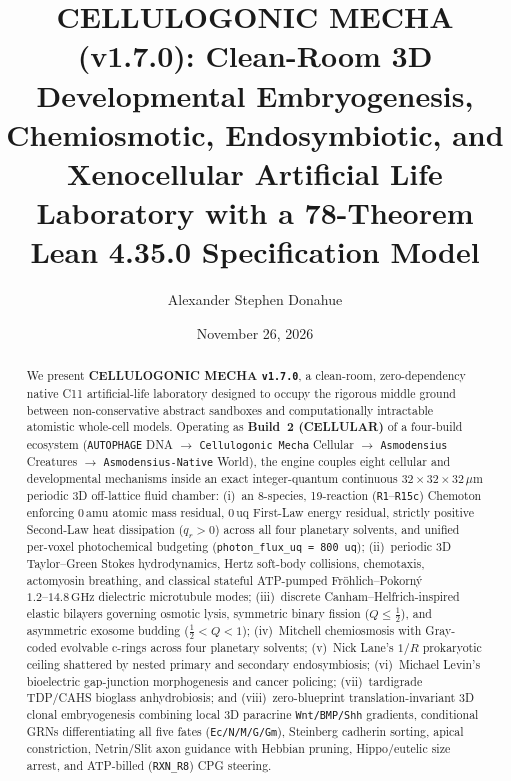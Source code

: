 \documentclass[11pt,reqno]{amsart}
\title[CELLULOGONIC MECHA v1.7.0]{CELLULOGONIC MECHA (v1.7.0): Clean-Room 3D Developmental Embryogenesis, Chemiosmotic, Endosymbiotic, and Xenocellular Artificial Life Laboratory with a 78-Theorem Lean 4.35.0 Specification Model}
\author{Alexander Stephen Donahue}
\date{November 26, 2026}
\theoremstyle{plain}
\theoremstyle{definition}
\theoremstyle{remark}
\begin{document}
\begin{abstract}
We present \textbf{CELLULOGONIC MECHA \texttt{v1.7.0}}, a clean-room, zero-dependency native C11 artificial-life laboratory designed to occupy the rigorous middle ground between non-conservative abstract sandboxes and computationally intractable atomistic whole-cell models. Operating as \textbf{Build~2 (CELLULAR)} of a four-build ecosystem (\texttt{AUTOPHAGE} DNA $\to$ \texttt{Cellulogonic Mecha} Cellular $\to$ \texttt{Asmodensius} Creatures $\to$ \texttt{Asmodensius-Native} World), the engine couples eight cellular and developmental mechanisms inside an exact integer-quantum continuous $32\times 32\times 32\,\mu\mathrm{m}$ periodic 3D off-lattice fluid chamber: (i)~an 8-species, 19-reaction (\texttt{R1}--\texttt{R15c}) Chemoton enforcing $0\,\mathrm{amu}$ atomic mass residual, $0\,\mathrm{uq}$ First-Law energy residual, strictly positive Second-Law heat dissipation ($q_r > 0$) across all four planetary solvents, and unified per-voxel photochemical budgeting (\texttt{photon\_flux\_uq = 800 uq}); (ii)~periodic 3D Taylor--Green Stokes hydrodynamics, Hertz soft-body collisions, chemotaxis, actomyosin breathing, and classical stateful ATP-pumped Fr\"ohlich--Pokorn\'y $1.2\text{--}14.8\,\mathrm{GHz}$ dielectric microtubule modes; (iii)~discrete Canham--Helfrich-inspired elastic bilayers governing osmotic lysis, symmetric binary fission ($Q \le \tfrac{1}{2}$), and asymmetric exosome budding ($\tfrac{1}{2} < Q < 1$); (iv)~Mitchell chemiosmosis with Gray-coded evolvable c-rings across four planetary solvents; (v)~Nick Lane's $1/R$ prokaryotic ceiling shattered by nested primary and secondary endosymbiosis; (vi)~Michael Levin's bioelectric gap-junction morphogenesis and cancer policing; (vii)~tardigrade TDP/CAHS bioglass anhydrobiosis; and (viii)~zero-blueprint translation-invariant 3D clonal embryogenesis combining local 3D paracrine \texttt{Wnt/BMP/Shh} gradients, conditional GRNs differentiating all five fates (\texttt{Ec/N/M/G/Gm}), Steinberg cadherin sorting, apical constriction, Netrin/Slit axon guidance with Hebbian pruning, Hippo/eutelic size arrest, and ATP-billed (\texttt{RXN\_R8}) CPG steering.


\end{abstract}
\end{document}
